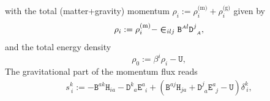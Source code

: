 \documentclass[
10pt, %
a4paper, %
oneside, %
headinclude,footinclude, %
BCOR5mm, %
]{scrartcl}
\newcommand{\sA}{\mathsmaller A}
\newcommand{\sB}{\mathsmaller B}
\newcommand{\pd}[1]{\partial_{#1}}
\newcommand{\tetrsymbol}{h}
\newcommand{\itetrsymbol}{\eta}
\newcommand{\itetr}[2]{\itetrsymbol^{#1}_{\phantom{#1}#2}}
\newcommand{\tetr}[2]{\tetrsymbol^{#1}_{\phantom{#1}#2}}
\newcommand{\stress}[2]{s_{\ #1}^{#2}}
\newcommand{\detTetr}{\tetrsymbol}
\newcommand{\Dfin}[2]{\mathtt{D}_{\phantom{#2}#1}^{#2}}	%
\newcommand{\Hfin}[2]{\mathtt{H}_{#2#1}}	%
\newcommand{\Efin}[2]{\mathtt{E}^{#1}_{\phantom{#1}#2}}	%
\newcommand{\Ufin}{\mathtt{U}}
\newcommand{\Bfin}[2]{\mathtt{B}^{#1#2}}	%
\newcommand{\w}[2]{W^{#1}_{\phantom{#1}#2}}
\newcommand{\LCsymb}{\bm{\in}}    %
\newcommand{\rhs}[1]{f_{#1}}
\newcommand{\indalg}[1]{\hat{\mathsmaller{#1}}}
\newcommand{\shift}[1]{\beta^{#1}}
\begin{document}
with the total (matter+gravity) momentum $ \rho_i := \rho^\text{(m)}_i + \rho^\text{(g)}_i $ given 
by
\begin{equation*}
	\rho_i := \rho^\text{(m)}_i  -\LCsymb_{ilj} 
	\Bfin{\sA}{l}\Dfin{\sA}{j},
\end{equation*}
and the total energy density
	\begin{equation*}
	\rho_0 := \beta^i \rho_i - \Ufin,
\end{equation*}
The gravitational part of the momentum flux reads
\begin{gather*}
	\stress{i}{k} := -\Bfin{a}{k} 
	\Hfin{a}{i} - 
	\Dfin{a}{k} \Efin{a}{i} + (\Bfin{a}{j} 
	\Hfin{a}{j} + 
	\Dfin{a}{j} \Efin{a}{j} 
	- \Ufin)\delta^k_{\ i},
\end{gather*}
\end{document}
